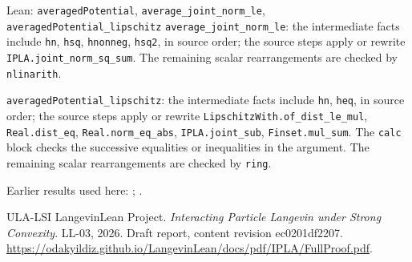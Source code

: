 \documentclass[11pt,a4paper]{article}
\begin{document}
\begin{leanbox}{Lean: \texttt{averagedPotential}, \texttt{average\_\allowbreak{}joint\_\allowbreak{}norm\_\allowbreak{}le}, \texttt{averagedPotential\_\allowbreak{}lipschitz}}
\texttt{average\_\allowbreak{}joint\_\allowbreak{}norm\_\allowbreak{}le}: the intermediate facts include \texttt{hn}, \texttt{hsq}, \texttt{hnonneg}, \texttt{hsq2}, in source order; the source steps apply or rewrite \texttt{IPLA.\allowbreak{}joint\_\allowbreak{}norm\_\allowbreak{}sq\_\allowbreak{}sum}. The remaining scalar rearrangements are checked by \texttt{nlinarith}.



\texttt{averaged\allowbreak{}Potential\_\allowbreak{}lipschitz}: the intermediate facts include \texttt{hn}, \texttt{heq}, in source order; the source steps apply or rewrite \texttt{Lipschitz\allowbreak{}With.\allowbreak{}of\_\allowbreak{}dist\_\allowbreak{}le\_\allowbreak{}mul}, \texttt{Real.\allowbreak{}dist\_\allowbreak{}eq}, \texttt{Real.\allowbreak{}norm\_\allowbreak{}eq\_\allowbreak{}abs}, \texttt{IPLA.\allowbreak{}joint\_\allowbreak{}sub}, \texttt{Finset.\allowbreak{}mul\_\allowbreak{}sum}. The \texttt{calc} block checks the successive equalities or inequalities in the argument. The remaining scalar rearrangements are checked by \texttt{ring}.
\end{leanbox}


Earlier results used here: \cite[Section~3.1.1]{LangevinLean2026IPLA}; \cite[Section~3.1.2]{LangevinLean2026IPLA}.

\begin{thebibliography}{ULA-LSI}
LangevinLean Project. \emph{Interacting Particle Langevin under Strong Convexity}. LL-03, 2026. Draft report, content revision ec0201df2207. \url{https://odakyildiz.github.io/LangevinLean/docs/pdf/IPLA/FullProof.pdf}.
\end{thebibliography}
\end{document}
